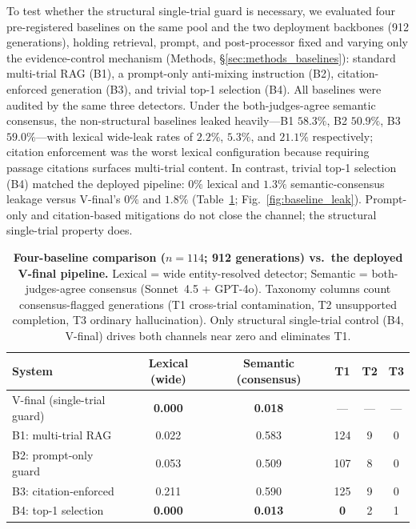 \documentclass[pdflatex,Numbered]{sn-jnl}
\theoremstyle{plain}
\begin{document}
To test whether the structural single-trial guard is necessary, we evaluated four pre-registered baselines on the same pool and the two deployment backbones (912 generations), holding retrieval, prompt, and post-processor fixed and varying only the evidence-control mechanism (Methods, \S\ref{sec:methods_baselines}): standard multi-trial RAG (B1), a prompt-only anti-mixing instruction (B2), citation-enforced generation (B3), and trivial top-1 selection (B4). All baselines were audited by the same three detectors. Under the both-judges-agree semantic consensus, the non-structural baselines leaked heavily---B1 $58.3\%$, B2 $50.9\%$, B3 $59.0\%$---with lexical wide-leak rates of $2.2\%$, $5.3\%$, and $21.1\%$ respectively; citation enforcement was the worst lexical configuration because requiring passage citations surfaces multi-trial content. In contrast, trivial top-1 selection (B4) matched the deployed pipeline: $0\%$ lexical and $1.3\%$ semantic-consensus leakage versus V-final's $0\%$ and $1.8\%$ (Table~\ref{tab:baselines}; Fig.~\ref{fig:baseline_leak}). Prompt-only and citation-based mitigations do not close the channel; the structural single-trial property does.

\begin{table}[!htbp]
\centering
\caption{\textbf{Four-baseline comparison ($n=114$; 912 generations) vs.\ the deployed V-final pipeline.} Lexical = wide entity-resolved detector; Semantic = both-judges-agree consensus (Sonnet~4.5 + GPT-4o). Taxonomy columns count consensus-flagged generations (T1 cross-trial contamination, T2 unsupported completion, T3 ordinary hallucination). Only structural single-trial control (B4, V-final) drives both channels near zero and eliminates T1.}
\label{tab:baselines}
\small
\setlength{\tabcolsep}{5pt}
\begin{tabular}{l c c c c c}
\toprule
System & Lexical (wide) & Semantic (consensus) & T1 & T2 & T3 \\
\midrule
V-final (single-trial guard) & \textbf{0.000} & \textbf{0.018} & --- & --- & --- \\
B1: multi-trial RAG          & 0.022 & 0.583 & 124 & 9 & 0 \\
B2: prompt-only guard        & 0.053 & 0.509 & 107 & 8 & 0 \\
B3: citation-enforced        & 0.211 & 0.590 & 125 & 9 & 0 \\
B4: top-1 selection          & \textbf{0.000} & \textbf{0.013} & \textbf{0} & 2 & 1 \\
\bottomrule
\end{tabular}
\end{table}
\end{document}
